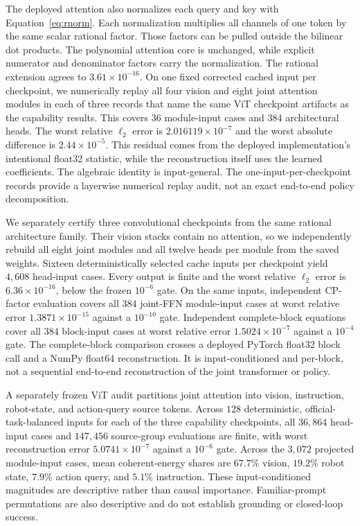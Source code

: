 \documentclass{article}
\begin{document}
The deployed attention also normalizes each query and key with Equation~\ref{eq:rnorm}.
Each normalization multiplies all channels of one token by the same scalar rational factor.
Those factors can be pulled outside the bilinear dot products. The polynomial attention core
is unchanged, while explicit numerator and denominator factors carry the normalization.
The rational extension agrees to $3.61\times10^{-16}$. On one fixed corrected cached input per checkpoint,
we numerically replay all four vision and eight joint attention modules in each of three records
that name the same ViT checkpoint artifacts as the capability results. This covers $36$
module-input cases and $384$ architectural heads. The worst relative $\ell_2$ error is
$2.016119\times10^{-7}$ and the worst absolute difference
is $2.44\times10^{-5}$. This residual comes from the deployed implementation's intentional
float32 statistic, while the reconstruction itself uses the learned coefficients. The algebraic
identity is input-general. The one-input-per-checkpoint records provide a layerwise numerical
replay audit, not an exact end-to-end policy decomposition.

We separately certify three convolutional checkpoints from the same rational architecture family.
Their vision stacks contain no attention, so we independently rebuild all eight joint modules and
all twelve heads per module from the saved weights. Sixteen deterministically selected cache
inputs per checkpoint yield $4{,}608$ head-input cases. Every output is finite and the worst
relative $\ell_2$ error is $6.36\times10^{-16}$, below the frozen $10^{-6}$ gate. On the same
inputs, independent CP-factor evaluation covers all $384$ joint-FFN module-input cases at worst
relative error $1.3871\times10^{-15}$ against a $10^{-10}$ gate. Independent complete-block
equations cover all $384$ block-input cases at worst relative error $1.5024\times10^{-7}$ against
a $10^{-4}$ gate. The complete-block comparison crosses a deployed PyTorch float32 block call and
a NumPy float64 reconstruction. It is input-conditioned and per-block, not a sequential
end-to-end reconstruction of the joint transformer or policy.

A separately frozen ViT audit partitions joint attention into vision, instruction, robot-state,
and action-query source tokens. Across $128$ deterministic, official-task-balanced inputs for each
of the three capability checkpoints, all $36{,}864$ head-input cases and $147{,}456$ source-group evaluations
are finite, with worst reconstruction error $5.0741\times10^{-7}$ against a $10^{-6}$ gate.
Across the $3{,}072$ projected module-input cases, mean coherent-energy shares are $67.7\%$ vision,
$19.2\%$ robot state, $7.9\%$ action query, and $5.1\%$ instruction. These input-conditioned
magnitudes are descriptive rather than causal importance. Familiar-prompt permutations are also
descriptive and do not establish grounding or closed-loop success.
\end{document}
